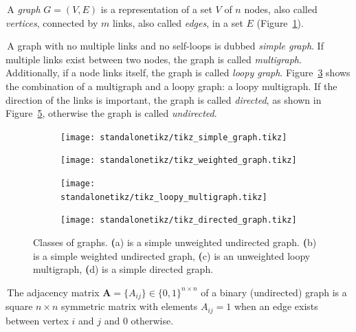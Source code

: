 \noindent\textbullet \,A \emph{graph} $G=(V,E)$ is a representation of a set $V$ of $n$ nodes, also called \emph{vertices}, connected by $m$ links, also called \emph{edges}, in a set $E$ (Figure~\ref{fig:simple_unweighted_graph}).

\noindent\textbullet \,A graph with no multiple links and no self-loops is dubbed \emph{simple graph}.
If multiple links exist between two nodes, the graph is called \emph{multigraph}.
Additionally, if a node links itself, the graph is called \emph{loopy graph}.
Figure~\ref{fig:loopy_multigraph} shows the combination of a multigraph and a loopy graph: a loopy multigraph.
If the direction of the links is important, the graph is called \emph{directed}, as shown in Figure~\ref{fig:directedgraph}, otherwise the graph is called \emph{undirected}.

\begin{figure}[htb!]
\centering
    \begin{subfigure}[hb]{0.4\textwidth}\centering
        \texttt{[image: standalonetikz/tikz\_simple\_graph.tikz]}
        \caption{}
        \label{fig:simple_unweighted_graph}
    \end{subfigure}
    \begin{subfigure}[hb]{0.4\textwidth}\centering
    \texttt{[image: standalonetikz/tikz\_weighted\_graph.tikz]}
    \caption{}
    \label{fig:simple_weighted_graph}
    \end{subfigure}
    \begin{subfigure}[hb]{0.4\textwidth}\centering
    \texttt{[image: standalonetikz/tikz\_loopy\_multigraph.tikz]}
    \caption{}
    \label{fig:loopy_multigraph}
    \end{subfigure}
    \begin{subfigure}[hb]{0.4\textwidth}\centering
    \texttt{[image: standalonetikz/tikz\_directed\_graph.tikz]}
    \caption{}
    \label{fig:directedgraph}
    \end{subfigure}
    \caption{Classes of graphs. {\textbf (a)} is a simple unweighted undirected graph. {\textbf (b)} is a simple weighted undirected graph, {\textbf (c)} is an unweighted loopy multigraph, {\textbf (d)} is a simple directed graph.}
\end{figure}

\noindent\textbullet \,The adjacency matrix $\mathbf{A}=\{A_{ij}\} \in \{0,1\}^{n \times n}$ of a binary (undirected) graph is a square $n\times n$ symmetric matrix with elements $A_{ij}=1$ when an edge exists between vertex $i$ and $j$ and $0$ otherwise.

